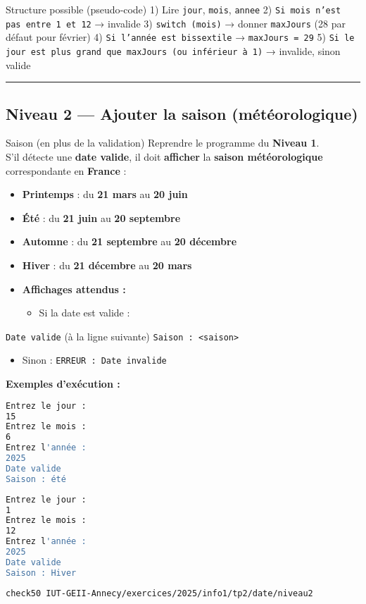 \begin{UPSTIinfor}{Structure possible (pseudo‑code)}
	1) Lire \texttt{jour}, \texttt{mois}, \texttt{annee}
	2) \texttt{Si mois n'est pas entre 1 et 12} → invalide
	3) \texttt{switch (mois)} → donner \texttt{maxJours} (28 par défaut pour février)
	4) \texttt{Si l'année est bissextile} → \texttt{maxJours = 29}
	5) \texttt{Si le jour est plus grand que maxJours (ou inférieur à 1)} → invalide, sinon valide
\end{UPSTIinfor}
\hrule
\subsection{Niveau 2 — Ajouter la saison (météorologique)}

\begin{UPSTIManipulation}{Saison (en plus de la validation)}
	Reprendre le programme du \textbf{Niveau 1}. \\
	S’il détecte une \textbf{date valide}, il doit \textbf{afficher} la \textbf{saison météorologique} correspondante en \textbf{France} :
	\begin{itemize}
		\item \textbf{Printemps} : du \textbf{21 mars} au \textbf{20 juin}
		\item \textbf{Été} : du \textbf{21 juin} au \textbf{20 septembre}
		\item \textbf{Automne} : du \textbf{21 septembre} au \textbf{20 décembre}
		\item \textbf{Hiver} : du \textbf{21 décembre} au \textbf{20 mars}
	\end{itemize}

	\begin{itemize}
		\item \textbf{Affichages attendus :}
		      \begin{itemize}
			      \item Si la date est valide :
		      \end{itemize}
	\end{itemize}
	\texttt{Date valide} (à la ligne suivante) \texttt{Saison : <saison>}
	\begin{itemize}
		\item Sinon : \texttt{ERREUR : Date invalide}
	\end{itemize}
	\textbf{Exemples d’exécution :}
	\begin{lstlisting}[language=bash]
Entrez le jour :
15
Entrez le mois :
6
Entrez l'année :
2025
Date valide
Saison : été
\end{lstlisting}
	\begin{lstlisting}[language=bash]
Entrez le jour :
1
Entrez le mois :
12
Entrez l'année :
2025
Date valide
Saison : Hiver
\end{lstlisting}
	\tcblower
	\begin{lstlisting}[language=bash]
check50 IUT-GEII-Annecy/exercices/2025/info1/tp2/date/niveau2
	\end{lstlisting}
\end{UPSTIManipulation}